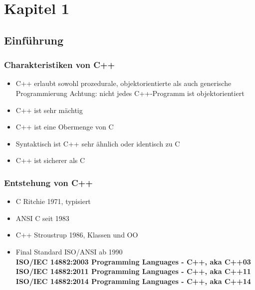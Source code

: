 
\section{Kapitel 1\hfill}
\label{sec:abschnitt}

\subsection{Einführung\hfill}
\label{sec:unterabschnitt}

\subsubsection{Charakteristiken von C++\hfill}
\label{sec:unterunterabschnitt}

\begin{itemize}
	\item C++ erlaubt sowohl prozedurale, objektorientierte als auch generische Programmierung
		Achtung: nicht jedes C++-Programm ist objektorientiert
	\item C++ ist sehr mächtig
	\item C++ ist eine Obermenge von C
	\item Syntaktisch ist C++ sehr ähnlich oder identisch zu C
	\item C++ ist sicherer als C
\end{itemize}

\subsubsection{Entstehung von C++\hfill}
\label{sec:unterunterabschnitt}
\begin{itemize}
	\item C 					Ritchie 1971, typisiert
	\item ANSI C 				seit 1983
	\item C++ 					Stroustrup 1986, Klassen und OO
	\item Final Standard ISO/ANSI 	ab 1990 
	\vspace{3mm}
	\\ \textbf{ISO/IEC 14882:2003 Programming Languages - C++, aka C++03} 			
	\vspace{3mm}
	\\ \textbf{ISO/IEC 14882:2011 Programming Languages - C++, aka C++11}
	\vspace{3mm}
	\\ \textbf{ISO/IEC 14882:2014 Programming Languages - C++, aka C++14}
\end{itemize}

